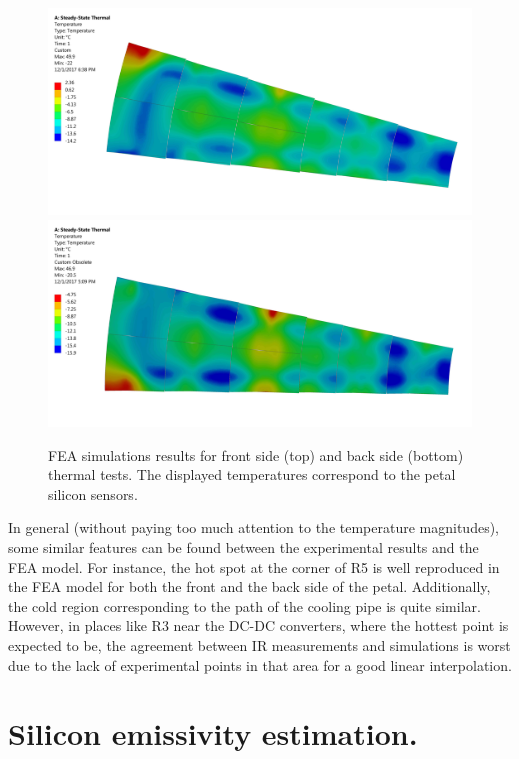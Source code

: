 		\begin{figure}[ht!]
			\centering
			\captionsetup{justification=centering,margin=0cm}
			\includegraphics[scale=0.045]{Figures/Chapter04/FEA_thermogram_markers_2_201711271001.jpg}
			\includegraphics[scale=0.045]{Figures/Chapter04/FEA_thermogram_markers_9_201711271006.jpg}
			\caption{FEA simulations results for front side (top) and back side (bottom) thermal tests. The displayed temperatures correspond to the petal silicon sensors.}\label{fig4.3}
		\end{figure}	
		
		In general (without paying too much attention to the temperature magnitudes), some similar features can be found between the experimental results and the FEA model. For instance, the hot spot at the corner of R5 is well reproduced in the FEA model for both the front and the back side of the petal. Additionally, the cold region corresponding to the path of the cooling pipe is quite similar. However, in places like R3 near the DC-DC converters, where the hottest point is expected to be, the agreement between IR measurements and simulations is worst due to the lack of experimental points in that area for a good linear interpolation.
	
	\section{Silicon emissivity estimation.}\label{section4.3}	
	

